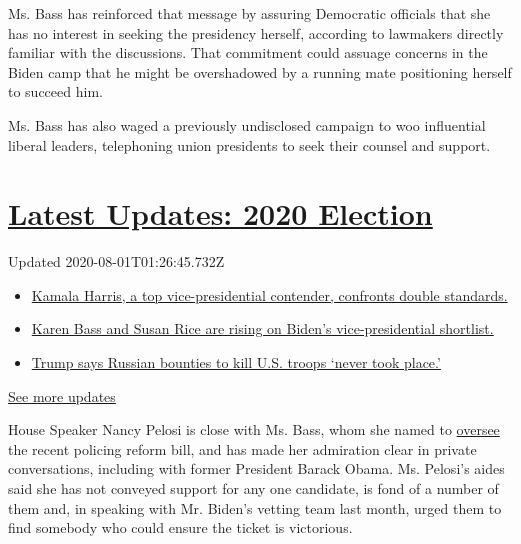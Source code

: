 Ms. Bass has reinforced that message by assuring Democratic officials
that she has no interest in seeking the presidency herself, according to
lawmakers directly familiar with the discussions. That commitment could
assuage concerns in the Biden camp that he might be overshadowed by a
running mate positioning herself to succeed him.

Ms. Bass has also waged a previously undisclosed campaign to woo
influential liberal leaders, telephoning union presidents to seek their
counsel and support.

\hypertarget{latest-updates-2020-election}{%
\section{\texorpdfstring{\href{https://www.nytimes3xbfgragh.onion/2020/07/31/us/elections/biden-vs-trump.html?action=click\&pgtype=Article\&state=default\&region=MAIN_CONTENT_1\&context=storylines_live_updates}{Latest
Updates: 2020
Election}}{Latest Updates: 2020 Election}}\label{latest-updates-2020-election}}

Updated 2020-08-01T01:26:45.732Z

\begin{itemize}
\tightlist
\item
  \href{https://www.nytimes3xbfgragh.onion/2020/07/31/us/elections/biden-vs-trump.html?action=click\&pgtype=Article\&state=default\&region=MAIN_CONTENT_1\&context=storylines_live_updates\#link-29fdff45}{Kamala
  Harris, a top vice-presidential contender, confronts double
  standards.}
\item
  \href{https://www.nytimes3xbfgragh.onion/2020/07/31/us/elections/biden-vs-trump.html?action=click\&pgtype=Article\&state=default\&region=MAIN_CONTENT_1\&context=storylines_live_updates\#link-13ec3d9c}{Karen
  Bass and Susan Rice are rising on Biden's vice-presidential
  shortlist.}
\item
  \href{https://www.nytimes3xbfgragh.onion/2020/07/31/us/elections/biden-vs-trump.html?action=click\&pgtype=Article\&state=default\&region=MAIN_CONTENT_1\&context=storylines_live_updates\#link-49e9a016}{Trump
  says Russian bounties to kill U.S. troops `never took place.'}
\end{itemize}

\href{https://www.nytimes3xbfgragh.onion/2020/07/31/us/elections/biden-vs-trump.html?action=click\&pgtype=Article\&state=default\&region=MAIN_CONTENT_1\&context=storylines_live_updates}{See
more updates}

House Speaker Nancy Pelosi is close with Ms. Bass, whom she named to
\href{https://www.nytimes3xbfgragh.onion/2020/06/10/us/politics/karen-bass.html}{oversee}
the recent policing reform bill, and has made her admiration clear in
private conversations, including with former President Barack Obama. Ms.
Pelosi's aides said she has not conveyed support for any one candidate,
is fond of a number of them and, in speaking with Mr. Biden's vetting
team last month, urged them to find somebody who could ensure the ticket
is victorious.

